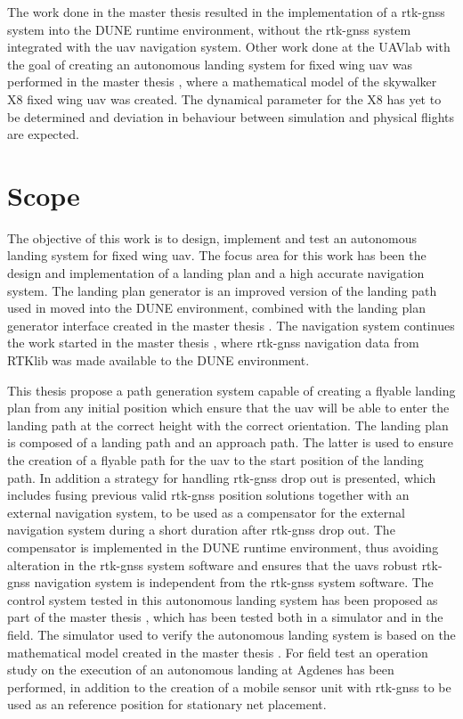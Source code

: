 The work done in the master thesis \citep{Spockeli} resulted in the implementation of a \gls{rtk-gnss} system into the DUNE runtime environment, without the \gls{rtk-gnss} system integrated with the \gls{uav} navigation system. Other work done at the UAVlab with the goal of creating an autonomous landing system for fixed wing \gls{uav} was performed in the master thesis \citep{Gryte}, where a mathematical model of the skywalker X8 fixed wing \gls{uav} was created. The dynamical parameter for the X8 has yet to be determined and deviation in behaviour between simulation and physical flights are expected.
\section{Scope}
The objective of this work is to design, implement and test an autonomous landing system for fixed wing \gls{uav}. The focus area for this work has been the design and implementation of a landing plan and a high accurate navigation system. The landing plan generator is an improved version of the landing path used in \citep{Skulstad&Syversen} moved into the DUNE environment, combined with the landing plan generator interface created in the master thesis \citep{Froelich}. The navigation system continues the work started in the master thesis \citep{Spockeli}, where \gls{rtk-gnss} navigation data from RTKlib was made available to the DUNE environment.

This thesis propose a path generation system capable of creating a flyable landing plan from any initial position which ensure that the \gls{uav} will be able to enter the landing path at the correct height with the correct orientation. The landing plan is composed of a landing path and an approach path. The latter is used to ensure the creation of a flyable path for the \gls{uav} to the start position of the landing path. In addition a strategy for handling \gls{rtk-gnss} drop out is presented, which includes fusing previous valid \gls{rtk-gnss} position solutions together with an external navigation system, to be used as a compensator for the external navigation system during a short duration after \gls{rtk-gnss} drop out. The compensator is implemented in the DUNE runtime environment, thus avoiding alteration in the \gls{rtk-gnss} system software and ensures that the \gls{uav}s robust \gls{rtk-gnss} navigation system is independent from the \gls{rtk-gnss} system software. The control system tested in this autonomous landing system has been proposed as part of the master thesis \citep{Sigurd}, which has been tested both in a simulator and in the field. The simulator used to verify the autonomous landing system is based on the mathematical model created in the master thesis \citep{Gryte}. For field test an operation study on the execution of an autonomous landing at Agdenes has been performed, in addition to the creation of a mobile sensor unit with \gls{rtk-gnss} to be used as an reference position for stationary net placement.
